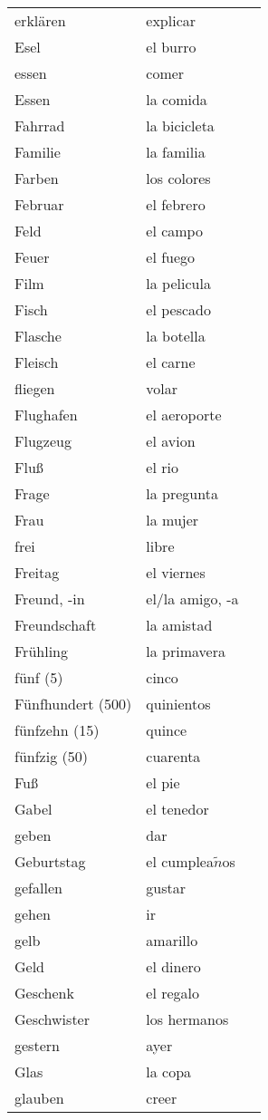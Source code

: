 \documentclass[10pt,spanish]{article}
\begin{document}
\begin{longtable}{p{} p{} | p{}}
erklären & explicar  \\
Esel & el burro  \\
essen & comer \\
Essen & la comida \\
Fahrrad & la bicicleta \\
Familie & la familia   \\
Farben & los colores  \\
Februar & el febrero  \\
Feld & el campo  \\
Feuer & el fuego  \\
Film & la pelicula  \\
Fisch & el pescado \\
Flasche & la botella  \\
Fleisch & el carne \\
fliegen & volar \\
Flughafen & el aeroporte \\
Flugzeug & el avion  \\
Fluß & el rio  \\
Frage & la pregunta \\
Frau & la mujer  \\
frei & libre  \\
Freitag & el viernes \\
Freund, -in & el/la amigo, -a  \\
Freundschaft & la amistad  \\
Frühling & la primavera  \\
fünf (5) & cinco  \\
Fünfhundert (500) & quinientos \\
fünfzehn (15) & quince  \\
fünfzig (50) & cuarenta \\
Fuß & el pie  \\
Gabel & el tenedor  \\
geben & dar  \\
Geburtstag & el cumplea$\tilde{n}$os  \\
gefallen & gustar  \\
gehen & ir  \\
gelb & amarillo  \\
Geld & el dinero  \\
Geschenk & el regalo \\
Geschwister & los hermanos  \\
gestern & ayer  \\
Glas & la copa  \\
glauben & creer \\

\end{longtable}
\end{document}
